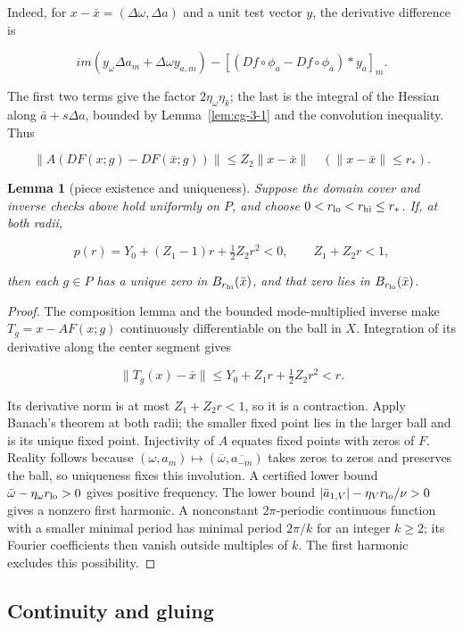 \documentclass[11pt]{article}
\newtheorem{lemma}{Lemma}[section]
\theoremstyle{definition}
\begin{document}
Indeed, for $x-\bar x=(\Delta\omega,\Delta a)$ and a unit test vector $y$, the derivative difference is

\[
 im(y_\omega\Delta a_m+\Delta\omega y_{a,m})
 -[(Df\circ\phi_a-Df\circ\phi_{\bar a})*y_a]_m.
\]

The first two terms give the factor $2\eta_\omega\eta_k$; the last is the integral of the Hessian along $\bar a+s\Delta a$, bounded by Lemma~\ref{lem:cg-3-1} and the convolution inequality. Thus

\[
 \|A(DF(x;g)-DF(\bar x;g))\|\le Z_2\|x-\bar x\|
 \quad(\|x-\bar x\|\le r_*).
\]

\begin{lemma}[piece existence and uniqueness]\label{lem:cg-3-2} Suppose the domain cover and inverse checks above hold uniformly on $P$, and choose $0<r_{\rm lo}<r_{\rm hi}\le r_*$. If, at both radii,

\[
 p(r)=Y_0+(Z_1-1)r+\tfrac12Z_2r^2<0,
 \qquad Z_1+Z_2r<1,
\]

then each $g\in P$ has a unique zero in $B_{r_{\rm hi}}(\bar x)$, and that zero lies in $B_{r_{\rm lo}}(\bar x)$.

\end{lemma}

\begin{proof} The composition lemma and the bounded mode-multiplied inverse make $T_g=x-AF(x;g)$ continuously differentiable on the ball in $X$. Integration of its derivative along the center segment gives

\[
 \|T_g(x)-\bar x\|\le Y_0+Z_1r+\tfrac12Z_2r^2<r.
\]

Its derivative norm is at most $Z_1+Z_2r<1$, so it is a contraction. Apply Banach's theorem at both radii; the smaller fixed point lies in the larger ball and is its unique fixed point. Injectivity of $A$ equates fixed points with zeros of $F$. Reality follows because $(\omega,a_m)\mapsto(\overline\omega,\overline{a_{-m}})$ takes zeros to zeros and preserves the ball, so uniqueness fixes this involution. A certified lower bound $\bar\omega-\eta_\omega r_{\rm lo}>0$ gives positive frequency. The lower bound $|\bar a_{1,V}|-\eta_Vr_{\rm lo}/\nu>0$ gives a nonzero first harmonic. A nonconstant $2\pi$-periodic continuous function with a smaller minimal period has minimal period $2\pi/k$ for an integer $k\ge2$; its Fourier coefficients then vanish outside multiples of $k$. The first harmonic excludes this possibility. \end{proof}

\subsection{Continuity and gluing}\label{sec:cg-4}
\end{document}
